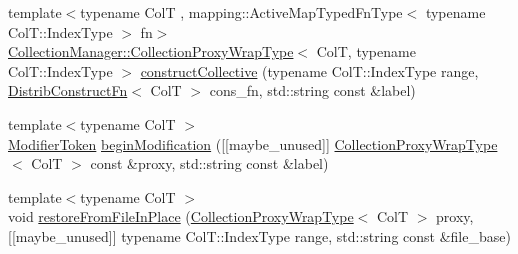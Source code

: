 \begin{DoxyCompactItemize}
\item 
{\footnotesize template$<$typename ColT , mapping\+::\+Active\+Map\+Typed\+Fn\+Type$<$ typename Col\+T\+::\+Index\+Type $>$ fn$>$ }\\\hyperlink{structvt_1_1vrt_1_1collection_1_1_collection_manager_a56458ed7f9bb22b631b9b3a745f42f94}{Collection\+Manager\+::\+Collection\+Proxy\+Wrap\+Type}$<$ ColT, typename Col\+T\+::\+Index\+Type $>$ \hyperlink{structvt_1_1vrt_1_1collection_1_1_collection_manager_a382237a66371d8d228a04d92e068810c}{construct\+Collective} (typename Col\+T\+::\+Index\+Type range, \hyperlink{structvt_1_1vrt_1_1collection_1_1_collection_manager_a9ef5ab71e344fdee8525c3f18241c305}{Distrib\+Construct\+Fn}$<$ ColT $>$ cons\+\_\+fn, std\+::string const \&label)
\item 
{\footnotesize template$<$typename ColT $>$ }\\\hyperlink{structvt_1_1vrt_1_1collection_1_1_modifier_token}{Modifier\+Token} \hyperlink{structvt_1_1vrt_1_1collection_1_1_collection_manager_abffd40070eda828f9085599096517960}{begin\+Modification} (\mbox{[}\mbox{[}maybe\+\_\+unused\mbox{]}\mbox{]} \hyperlink{structvt_1_1vrt_1_1collection_1_1_collection_manager_a56458ed7f9bb22b631b9b3a745f42f94}{Collection\+Proxy\+Wrap\+Type}$<$ ColT $>$ const \&proxy, std\+::string const \&label)
\item 
{\footnotesize template$<$typename ColT $>$ }\\void \hyperlink{structvt_1_1vrt_1_1collection_1_1_collection_manager_af7ce1091aa2af6663a71b90a538963f9}{restore\+From\+File\+In\+Place} (\hyperlink{structvt_1_1vrt_1_1collection_1_1_collection_manager_a56458ed7f9bb22b631b9b3a745f42f94}{Collection\+Proxy\+Wrap\+Type}$<$ ColT $>$ proxy, \mbox{[}\mbox{[}maybe\+\_\+unused\mbox{]}\mbox{]} typename Col\+T\+::\+Index\+Type range, std\+::string const \&file\+\_\+base)
\end{DoxyCompactItemize}
